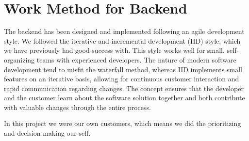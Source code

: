 \section{Work Method for Backend}
\label{sec:workmethod}

The backend has been designed and implemented following an agile development style. We followed the iterative and incremental development (IID) style, which we have previously had good success with. This style works well for small, self-organizing teams with experienced developers. The nature of modern software development tend to misfit the waterfall method, whereas IID implements small features on an iterative basis, allowing for continuous customer interaction and rapid communication regarding changes. The concept ensures that the developer and the customer learn about the software solution together and both contribute with valuable changes through the entire process. 

In this project we were our own customers, which means we did the prioritizing and decision making our-self.